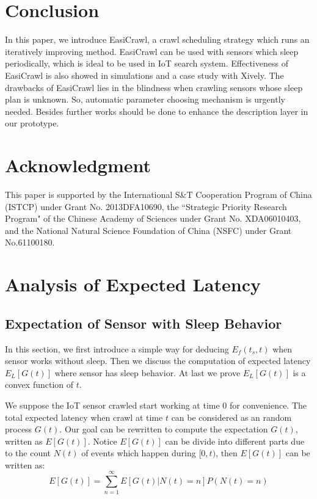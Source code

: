 \documentclass[conference]{IEEEtran}
\begin{document}
\section{Conclusion} \label{conclusion}

In this paper, we introduce EasiCrawl, a crawl scheduling strategy which runs an iteratively improving method. 
EasiCrawl can be used with sensors which sleep periodically, which is ideal to be used in IoT search system. 
Effectiveness of EasiCrawl is also showed in simulations and a case study with Xively. 
The drawbacks of EasiCrawl lies in the blindness when crawling sensors whose sleep plan is unknown. 
So, automatic parameter choosing mechanism is urgently needed.
Besides further works should be done to enhance the description layer in our prototype.

\section*{Acknowledgment}

This paper is supported by the International S\&T Cooperation Program of China (ISTCP) under Grant No. 2013DFA10690, the ``Strategic Priority Research Program" of the Chinese Academy of Sciences under Grant No. XDA06010403, and the National Natural Science Foundation of China (NSFC) under Grant No.61100180.

\ifCLASSOPTIONcaptionsoff
  \newpage
\fi





\appendices
\section{Analysis of Expected Latency}

\subsection{Expectation of Sensor with Sleep Behavior}

In this section, we first introduce a simple way for deducing $E_f(t_s, t)$ when sensor works without sleep.
Then we discuss the computation of expected latency $E_L[G(t)]$ where sensor has sleep behavior.
At last we prove $E_L[G(t)]$ is a convex function of $t$.

We suppose the IoT sensor crawled start working at time $0$ for convenience. 
The total expected latency when crawl at time $t$ can be considered as an random process $G(t)$. Our goal can be rewritten to compute the expectation $G(t)$, written as $E[G(t)]$. 
Notice $E[G(t)]$ can be divide into different parts due to the count $N(t)$ of events which happen during $[0, t)$, then $E[G(t)]$ can be written as:
\begin{equation}
E[G(t)] = \sum_{n=1}^{\infty} E[G(t)|N(t)=n]P(N(t)=n) \label{EG}
\end{equation}
\end{document}
